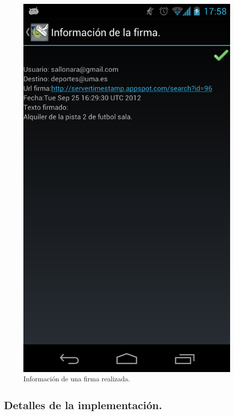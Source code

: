 \begin{figure}
  \centering
    \includegraphics[scale=0.2]{./Android/imagenes/informacionFirma.png}
  \caption{Información de una firma realizada.}
  \label{fig:informacionFirma}
\end{figure}

\subsection{Detalles de la implementación.}

